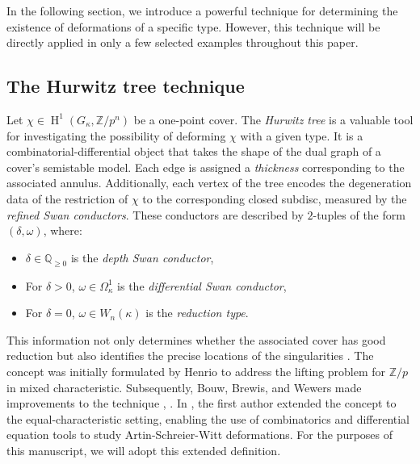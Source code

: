\documentclass{compositio}
\theoremstyle{remark}
\theoremstyle{remark}
\DeclareMathOperator{\cohom}{H}
\begin{document}
In the following section, we introduce a powerful technique for determining the existence of deformations of a specific type. However, this technique will be directly applied in only a few selected examples throughout this paper.

\subsection{The Hurwitz tree technique} 

Let $\chi \in \cohom^1(G_{\kappa}, \mathbb{Z}/p^n)$ be a one-point cover. The \textit{Hurwitz tree} is a valuable tool for investigating the possibility of deforming $\chi$ with a given type. It is a combinatorial-differential object that takes the shape of the dual graph of a cover's semistable model. Each edge is assigned a \textit{thickness} corresponding to the associated annulus. Additionally, each vertex of the tree encodes the degeneration data of the restriction of $\chi$ to the corresponding closed subdisc, measured by the \textit{refined Swan conductors}. These conductors are described by $2$-tuples of the form $(\delta, \omega)$, where:
\begin{itemize}
    \item $\delta \in \mathbb{Q}_{\ge 0}$ is the \textit{depth Swan conductor},
    \item For $\delta > 0$, $\omega \in \Omega^1_{\kappa}$ is the \textit{differential Swan conductor},
    \item For $\delta = 0$, $\omega \in W_n(\kappa)$ is the \textit{reduction type}.
\end{itemize}

This information not only determines whether the associated cover has good reduction but also identifies the precise locations of the singularities \cite{MR904945}. The concept was initially formulated by Henrio \cite{2000math.....11098H} to address the lifting problem for $\mathbb{Z}/p$ in mixed characteristic. Subsequently, Bouw, Brewis, and Wewers made improvements to the technique \cite{MR2254623}, \cite{MR2534115}. In \cite{2020arXiv201013614D}, the first author extended the concept to the equal-characteristic setting, enabling the use of combinatorics and differential equation tools to study Artin-Schreier-Witt deformations. For the purposes of this manuscript, we will adopt this extended definition.
\end{document}
